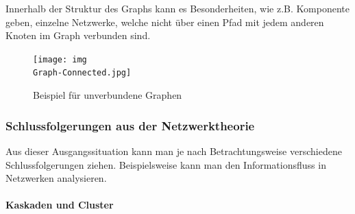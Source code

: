 Innerhalb der Struktur des Graphs kann es Besonderheiten, wie z.B. Komponente geben, einzelne Netzwerke, welche nicht über einen Pfad mit jedem anderen Knoten im Graph verbunden sind.

\begin{figure}[htbp]
	\begin{center}
	\texttt{[image: img\\Graph-Connected.jpg]}
	\caption{Beispiel für unverbundene Graphen \cite{Kleinberg-2009-oz}}
	\label{fig:graph1}
	\end{center}
\end{figure}


\subsubsection{Schlussfolgerungen aus der Netzwerktheorie}

Aus dieser Ausgangssituation kann man je nach Betrachtungsweise verschiedene Schlussfolgerungen ziehen.
Beispielsweise kann man den Informationsfluss in Netzwerken analysieren.

\paragraph{Kaskaden und Cluster}

